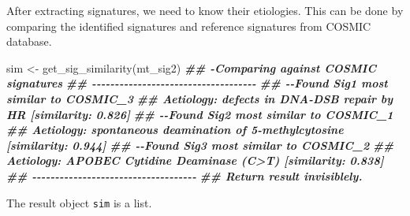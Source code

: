 \documentclass[
  12pt,
  a4paper,
  twoside]{book}
\newenvironment{Shaded}{\begin{snugshade}}{\end{snugshade}}
\newcommand{\DocumentationTok}[1]{\textcolor[rgb]{0.56,0.35,0.01}{\textbf{\textit{#1}}}}
\newcommand{\FunctionTok}[1]{\textcolor[rgb]{0.00,0.00,0.00}{#1}}
\newcommand{\NormalTok}[1]{#1}
\newcommand{\OtherTok}[1]{\textcolor[rgb]{0.56,0.35,0.01}{#1}}
\begin{document}
After extracting signatures, we need to know their etiologies. This can be done by comparing the identified signatures and reference signatures from COSMIC database.

\begin{Shaded}
\begin{Highlighting}[]
\NormalTok{sim }\OtherTok{\textless{}{-}} \FunctionTok{get\_sig\_similarity}\NormalTok{(mt\_sig2)}
\DocumentationTok{\#\# {-}Comparing against COSMIC signatures}
\DocumentationTok{\#\# {-}{-}{-}{-}{-}{-}{-}{-}{-}{-}{-}{-}{-}{-}{-}{-}{-}{-}{-}{-}{-}{-}{-}{-}{-}{-}{-}{-}{-}{-}{-}{-}{-}{-}{-}{-}}
\DocumentationTok{\#\# {-}{-}Found Sig1 most similar to COSMIC\_3}
\DocumentationTok{\#\#    Aetiology: defects in DNA{-}DSB repair by HR [similarity: 0.826]}
\DocumentationTok{\#\# {-}{-}Found Sig2 most similar to COSMIC\_1}
\DocumentationTok{\#\#    Aetiology: spontaneous deamination of 5{-}methylcytosine [similarity: 0.944]}
\DocumentationTok{\#\# {-}{-}Found Sig3 most similar to COSMIC\_2}
\DocumentationTok{\#\#    Aetiology: APOBEC Cytidine Deaminase (C\textgreater{}T) [similarity: 0.838]}
\DocumentationTok{\#\# {-}{-}{-}{-}{-}{-}{-}{-}{-}{-}{-}{-}{-}{-}{-}{-}{-}{-}{-}{-}{-}{-}{-}{-}{-}{-}{-}{-}{-}{-}{-}{-}{-}{-}{-}{-}}
\DocumentationTok{\#\# Return result invisiblely.}
\end{Highlighting}
\end{Shaded}

The result object \texttt{sim} is a list.
\end{document}
